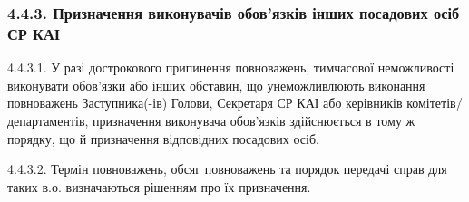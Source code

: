     \subsubsection*{4.4.3. Призначення виконувачів обов'язків інших посадових осіб СР КАІ}
        4.4.3.1. У разі дострокового припинення повноважень, тимчасової неможливості виконувати обов'язки або інших обставин, що унеможливлюють виконання повноважень Заступника(-ів) Голови, Секретаря СР КАІ або керівників комітетів/департаментів, призначення виконувача обов'язків здійснюється в тому ж порядку, що й призначення відповідних посадових осіб.
         
        4.4.3.2. Термін повноважень, обсяг повноважень та порядок передачі справ для таких в.о. визначаються рішенням про їх призначення. 